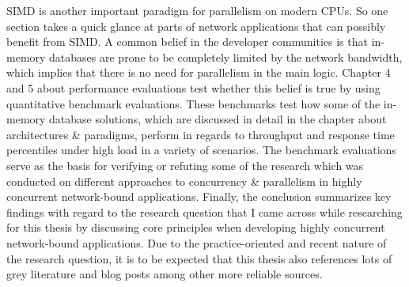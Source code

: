 SIMD is another important paradigm for parallelism on modern CPUs. So one section takes a quick glance at parts of network applications that can possibly benefit from SIMD. \newline
A common belief in the developer communities is that in-memory databases are prone to be completely limited by the network bandwidth, which implies that there is no need for parallelism in the main logic. Chapter 4 and 5 about performance evaluations test whether this belief is true by using quantitative benchmark evaluations. These benchmarks test how some of the in-memory database solutions, which are discussed in detail in the chapter about architectures \& paradigms, perform in regards to throughput and response time percentiles under high load in a variety of scenarios. The benchmark evaluations serve as the basis for verifying or refuting some of the research which was conducted on different approaches to concurrency \& parallelism in highly concurrent network-bound applications. \newline
Finally, the conclusion summarizes key findings with regard to the research question that I came across while researching for this thesis by discussing core principles when developing highly concurrent network-bound applications. \newline
Due to the practice-oriented and recent nature of the research question, it is to be expected that this thesis also references lots of grey literature and blog posts among other more reliable sources.
